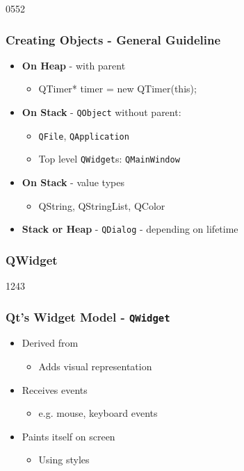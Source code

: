 \begin{slide}[fragile]{0552}\frametitle{Creating Objects - General Guideline}
 \begin{itemize}

 \item \textbf{On Heap} -  with parent
   \begin{itemize}
   \item[]
   \begin{cpp}
QTimer* timer = new QTimer(this);
    \end{cpp}
   \end{itemize}\medskip

    \item \textbf{On Stack} - \texttt{QObject} without parent:
    \begin{itemize}
    \item \texttt{QFile}, \texttt{QApplication}
    \item Top level \texttt{QWidget}s: \texttt{QMainWindow}
    \end{itemize}
    \medskip

\item \textbf{On Stack} - value types
    \begin{itemize}
    \item QString, QStringList, QColor
   \end{itemize}\medskip

\item \textbf{Stack or Heap} - \texttt{QDialog} - depending on lifetime 
  \end{itemize}
\end{slide}

\subsubsection{QWidget}
\begin{slide}{1243}
  \frametitle{Qt's Widget Model - \texttt{QWidget}}
  \begin{itemize}
 \item Derived from 
    \begin{itemize}
    \item Adds visual representation
    \end{itemize}\medskip
  \item Receives events
    \begin{itemize}
    \item e.g. mouse, keyboard events
    \end{itemize}\medskip
  \item Paints itself on screen
    \begin{itemize}
    \item Using styles
    \end{itemize}
\end{itemize}
\end{slide}

